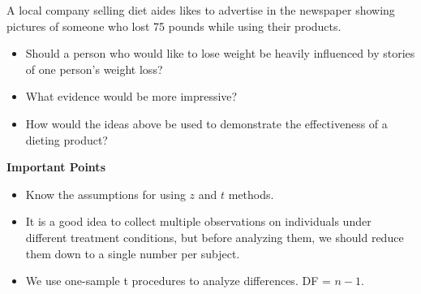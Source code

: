 A local company selling diet aides likes to advertise in the newspaper
showing pictures of someone who lost 75 pounds while using their
products.  
\begin{itemize}
 \item Should a person who would like to lose weight be heavily
   influenced by stories of one person's weight loss?\vspace{1cm}
 \item What evidence would be more impressive?\vspace{1cm}
 \item How would the ideas above be used to demonstrate the
   effectiveness of a dieting product?\vspace{1cm}
\end{itemize}



\begin{center}
  {\large\bf Important Points}
\end{center}
   
\begin{itemize}
  \item Know the assumptions for using $z$ and $t$ methods. \vfill
  \item It is a good idea to collect multiple observations on
    individuals under different treatment conditions, but before
    analyzing them, we should reduce them down to a single number per
    subject.\vfill
  \item We use one-sample t procedures to analyze differences. DF =
    $n-1$. \vspace*{1cm}
\end{itemize}

